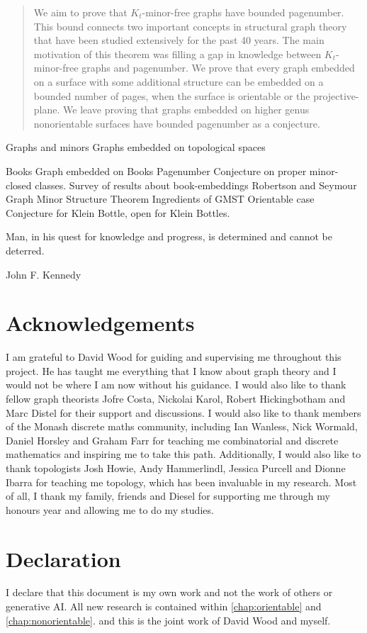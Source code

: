 \begin{abstract}
	We aim to prove that \(K_t\)-minor-free graphs have bounded pagenumber. This bound connects two important concepts in structural graph theory that have been studied extensively for the past 40 years. The main motivation of this theorem was filling a gap in knowledge between $K_t$-minor-free graphs and pagenumber. We prove that every graph embedded on a surface with some additional structure can be embedded on a bounded number of pages, when the surface is orientable or the projective-plane. We leave proving that graphs embedded on higher genus nonorientable surfaces have bounded pagenumber as a conjecture. 
\end{abstract}

Graphs and minors
Graphs embedded on topological spaces

Books
Graph embedded on Books
Pagenumber
Conjecture on proper minor-closed classes.
Survey of results about book-embeddings
Robertson and Seymour Graph Minor Structure Theorem
Ingredients of GMST
Orientable case
Conjecture for Klein Bottle, open for Klein Bottles.


\epigraph{Man, in his quest for knowledge and progress, is determined and cannot be deterred.}{John F. Kennedy}
\newpage

\section{Acknowledgements}
I am grateful to David Wood for guiding and supervising me throughout this project. He has taught me everything that I know about graph theory and I would not be where I am now without his guidance. I would also like to thank fellow graph theorists Jofre Costa, Nickolai Karol, Robert Hickingbotham and Marc Distel for their support and discussions. I would also like to thank members of the Monash discrete maths community, including Ian Wanless, Nick Wormald, Daniel Horsley and Graham Farr for teaching me combinatorial and discrete mathematics and inspiring me to take this path. Additionally, I would also like to thank topologists Josh Howie, Andy Hammerlindl, Jessica Purcell and Dionne Ibarra for teaching me topology, which has been invaluable in my research. Most of all, I thank my family, friends and Diesel for supporting me through my honours year and allowing me to do my studies.

\section{Declaration}

I declare that this document is my own work and not the work of others or generative AI. All new research is contained within \cref{chap:orientable} and \cref{chap:nonorientable}. and this is the joint work of David Wood and myself.